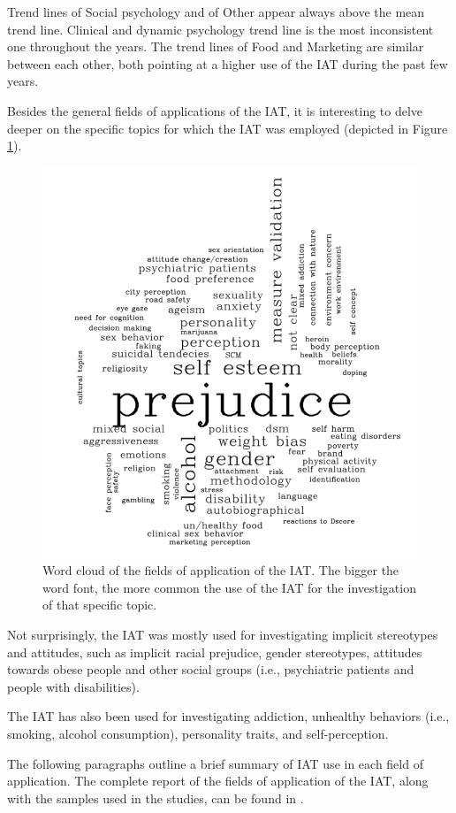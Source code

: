 \documentclass[12pt]{book}
\begin{document}
Trend lines of Social psychology and of Other appear always above the mean trend line. Clinical and dynamic psychology trend line is the most inconsistent one throughout the years. 
The trend lines of Food and Marketing are similar between each other, both pointing at a higher use of the IAT during the past few years. 

Besides the general fields of applications of the IAT, it is interesting to delve deeper on the specific topics for which the IAT was employed (depicted in Figure \ref{fig:wordcloud}).

\begin{figure}[h!]
	\centering
	\includegraphics[width=0.5\linewidth]{wordcloudtopic.png}
	\caption{\label{fig:wordcloud} Word cloud of the fields of application of the IAT.  The bigger the word font, the more common the use of the IAT for the investigation of that specific topic.}
\end{figure}

Not surprisingly, the IAT was mostly used for investigating  implicit stereotypes and attitudes, such as implicit racial prejudice, gender stereotypes, attitudes towards obese people and other social groups (i.e., psychiatric patients and people with disabilities). 

The IAT has also been used for investigating addiction, unhealthy behaviors (i.e., smoking, alcohol consumption), personality traits, and self-perception.

The following paragraphs outline a brief summary of IAT use in each field of application. The complete report of the fields of application of the IAT, along with the samples used in the studies, can be found in .
\end{document}
